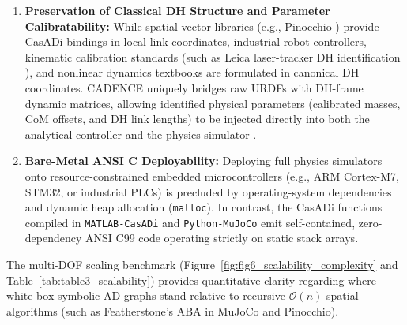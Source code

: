 \documentclass[fleqn,10pt]{article}
\begin{document}
\begin{enumerate}
	\item \textbf{Preservation of Classical DH Structure and Parameter Calibratability:} While spatial-vector libraries (e.g., Pinocchio \cite{carpentier2019pinocchio}) provide CasADi bindings in local link coordinates, industrial robot controllers, kinematic calibration standards (such as Leica laser-tracker DH identification \cite{li2021overview, asr2026calibration}), and nonlinear dynamics textbooks \cite{craig2005introduction, spong2020robot, siciliano2010robotics} are formulated in canonical DH coordinates. CADENCE uniquely bridges raw URDFs with DH-frame dynamic matrices, allowing identified physical parameters (calibrated masses, CoM offsets, and DH link lengths) to be injected directly into both the analytical controller and the physics simulator \cite{asr2026calibration}.
	\item \textbf{Bare-Metal ANSI C Deployability:} Deploying full physics simulators onto resource-constrained embedded microcontrollers (e.g., ARM Cortex-M7, STM32, or industrial PLCs) is precluded by operating-system dependencies and dynamic heap allocation (\texttt{malloc}). In contrast, the CasADi functions compiled in \texttt{MATLAB-CasADi} and \texttt{Python-MuJoCo} emit self-contained, zero-dependency ANSI C99 code operating strictly on static stack arrays.
\end{enumerate}

The multi-DOF scaling benchmark (Figure~\ref{fig:fig6_scalability_complexity} and Table~\ref{tab:table3_scalability}) provides quantitative clarity regarding where white-box symbolic AD graphs stand relative to recursive $\mathcal{O}(n)$ spatial algorithms (such as Featherstone's ABA in MuJoCo and Pinocchio).
\end{document}
